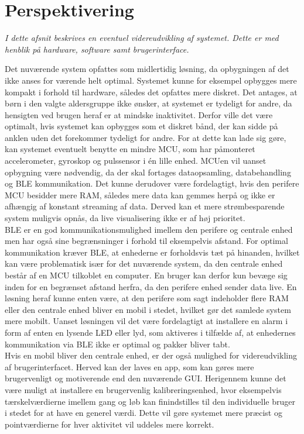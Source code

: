 \section{Perspektivering}
\textit{I dette afsnit beskrives en eventuel videreudvikling af systemet. Dette er med henblik på hardware, software samt brugerinterface.}

Det nuværende system opfattes som midlertidig løsning, da opbygningen af det ikke anses for værende helt optimal. Systemet kunne for eksempel opbygges mere kompakt i forhold til hardware, således det opfattes mere diskret. Det antages, at børn i den valgte aldersgruppe ikke ønsker, at systemet er tydeligt for andre, da hensigten ved brugen heraf er at mindske inaktivitet. Derfor ville det være optimalt, hvis systemet kan opbygges som et diskret bånd, der kan sidde på anklen uden det forekommer tydeligt for andre. For at dette kan lade sig gøre, kan systemet eventuelt benytte en mindre MCU, som har påmonteret accelerometer, gyroskop og pulssensor i én lille enhed. MCUen vil uanset opbygning være nødvendig, da der skal fortages dataopsamling, databehandling og BLE kommunikation. Det kunne derudover være fordelagtigt, hvis den perifere MCU besidder mere RAM, således mere data kan gemmes herpå og ikke er afhængig af konstant streaming af data. Derved kan et mere strømbesparende system muligvis opnås, da live visualisering ikke er af høj prioritet. \\
BLE er en god kommunikationsmulighed imellem den perifere og centrale enhed men har også sine begrænsninger i forhold til eksempelvis afstand. For optimal kommunikation kræver BLE, at enhederne er forholdsvis tæt på hinanden, hvilket kan være problematisk især for det nuværende system, da den centrale enhed består af en MCU tilkoblet en computer. En bruger kan derfor kun bevæge sig inden for en begrænset afstand herfra, da den perifere enhed sender data live. En løsning heraf kunne enten være, at den perifere som sagt indeholder flere RAM eller den centrale enhed bliver en mobil i stedet, hvilket gør det samlede system mere mobilt. Uanset løsningen vil det være fordelagtigt at installere en alarm i form af enten en lysende LED eller lyd, som aktiveres i tilfælde af, at enhedernes kommunikation via BLE ikke er optimal og pakker bliver tabt. \\
Hvis en mobil bliver den centrale enhed, er der også mulighed for videreudvikling af brugerinterfacet. Herved kan der laves en app, som kan gøres mere brugervenligt og motiverende end den nuværende GUI. Herigennem kunne det være muligt at installere en brugervenlig kalibreringsenhed, hvor eksempelvis tærskelværdierne imellem gang og løb kan finindstilles til den individuelle bruger i stedet for at have en generel værdi. Dette vil gøre systemet mere præcist og pointværdierne for hver aktivitet vil uddeles mere korrekt.\\
